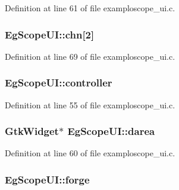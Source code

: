 Definition at line 61 of file examploscope\+\_\+ui.\+c.

\subsubsection[{\texorpdfstring{chn}{chn}}]{ Eg\+Scope\+U\+I\+::chn\mbox{[}2\mbox{]}}\hypertarget{struct_eg_scope_u_i_a204177cc9c742bcb4b3d72959eddb792}{}\label{struct_eg_scope_u_i_a204177cc9c742bcb4b3d72959eddb792}


Definition at line 69 of file examploscope\+\_\+ui.\+c.

\subsubsection[{\texorpdfstring{controller}{controller}}]{ Eg\+Scope\+U\+I\+::controller}\hypertarget{struct_eg_scope_u_i_aae073bd753ec8a1a1df78586536a3df2}{}\label{struct_eg_scope_u_i_aae073bd753ec8a1a1df78586536a3df2}


Definition at line 55 of file examploscope\+\_\+ui.\+c.

\subsubsection[{\texorpdfstring{darea}{darea}}]{\setlength{\rightskip}{0pt plus 5cm}Gtk\+Widget$\ast$ Eg\+Scope\+U\+I\+::darea}\hypertarget{struct_eg_scope_u_i_a9e1d58c0eb584c74ac10a811ad9409c7}{}\label{struct_eg_scope_u_i_a9e1d58c0eb584c74ac10a811ad9409c7}


Definition at line 60 of file examploscope\+\_\+ui.\+c.

\subsubsection[{\texorpdfstring{forge}{forge}}]{ Eg\+Scope\+U\+I\+::forge}\hypertarget{struct_eg_scope_u_i_a95b883299aeb59de648cd9eb1c5ee4b7}{}\label{struct_eg_scope_u_i_a95b883299aeb59de648cd9eb1c5ee4b7}


